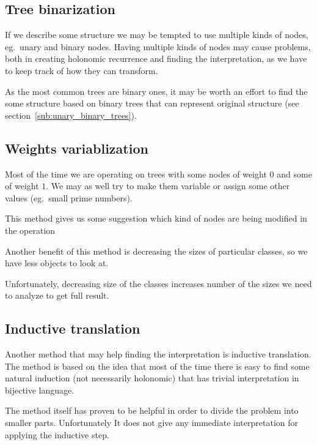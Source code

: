 \documentclass[final]{article}
\theoremstyle{definition}
\theoremstyle{remark}
\begin{document}
\subsection{Tree binarization}%
\label{sub:tree_binarization}

If we describe some structure we may be tempted to use multiple kinds of nodes, eg.~unary and binary nodes. Having multiple kinds of nodes may cause problems, both in creating holonomic recurrence and finding the interpretation, as we have to keep track of how they can transform.

As the most common trees are binary ones, it may be worth an effort to find the some structure based on binary trees that can represent original structure (see section~\ref{sub:unary_binary_trees}).

\subsection{Weights variablization}%
\label{sub:weights_variablization}

Most of the time we are operating on trees with some nodes of weight \(0\) and some of weight \(1\). We may as well try to make them variable or assign some other values (eg.\ small prime numbers).

This method gives us some suggestion which kind of nodes are being modified in the operation

Another benefit of this method is decreasing the sizes of particular classes, so we have less objects to look at.

Unfortunately, decreasing size of the classes increases number of the sizes we need to analyze to get full result.


\subsection{Inductive translation}%
\label{sub:inductive_translation}

Another method that may help finding the interpretation is inductive translation\cite{doron}. The method is based on the idea that most of the time there is easy to find some natural induction (not necessarily holonomic) that has trivial interpretation in bijective language.


The method itself has proven to be helpful in order to divide the problem into smaller parts. Unfortunately It does not give any immediate interpretation for applying the inductive step.
\end{document}
